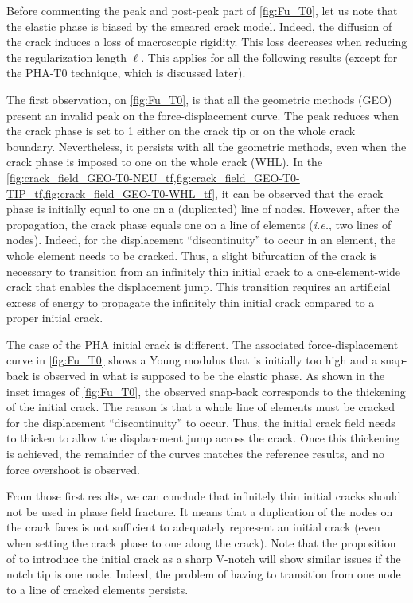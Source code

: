 \documentclass[OptSoft]{jtcam_preprint}
\begin{document}
Before commenting the peak and post-peak part of \cref{fig:Fu_T0}, let us note that the elastic phase is biased by the smeared crack model.
Indeed, the diffusion of the crack induces a loss of macroscopic rigidity.
This loss decreases when reducing the regularization length $\ell$.
This applies for all the following results (except for the PHA-T0 technique, which is discussed later).

The first observation, on \cref{fig:Fu_T0}, is that all the geometric methods (GEO) present an invalid peak on the force-displacement curve.
The peak reduces when the crack phase is set to 1 either on the crack tip or on the whole crack boundary.
Nevertheless, it persists with all the geometric methods, even when the crack phase is imposed to one on the whole crack (WHL).
In the \cref{fig:crack_field_GEO-T0-NEU_tf,fig:crack_field_GEO-T0-TIP_tf,fig:crack_field_GEO-T0-WHL_tf}, it can be observed that the crack phase is initially equal to one on a (duplicated) line of nodes.
However, after the propagation, the crack phase equals one on a line of elements (\emph{i.e.}, two lines of nodes).
Indeed, for the displacement ``discontinuity'' to occur in an element, the whole element needs to be cracked.
Thus, a slight bifurcation of the crack is necessary to transition from an infinitely thin initial crack to a one-element-wide crack that enables the displacement jump.
This transition requires an artificial excess of energy to propagate the infinitely thin initial crack compared to a proper initial crack.

The case of the PHA initial crack is different.
The associated force-displacement curve in \cref{fig:Fu_T0} shows a Young modulus that is initially too high and a snap-back is observed in what is supposed to be the elastic phase.
As shown in the inset images of \cref{fig:Fu_T0}, the observed snap-back corresponds to the thickening of the initial crack.
The reason is that a whole line of elements must be cracked for the displacement ``discontinuity'' to occur.
Thus, the initial crack field needs to thicken to allow the displacement jump across the crack.
Once this thickening is achieved, the remainder of the curves matches the reference results, and no force overshoot is observed.

From those first results, we can conclude that infinitely thin initial cracks should not be used in phase field fracture.
It means that a duplication of the nodes on the crack faces is not sufficient to adequately represent an initial crack (even when setting the crack phase to one along the crack).
Note that the proposition of \textcite{tanne_crack_2018} to introduce the initial crack as a sharp V-notch will show similar issues if the notch tip is one node.
Indeed, the problem of having to transition from  one node to a line of cracked elements persists.
\end{document}
